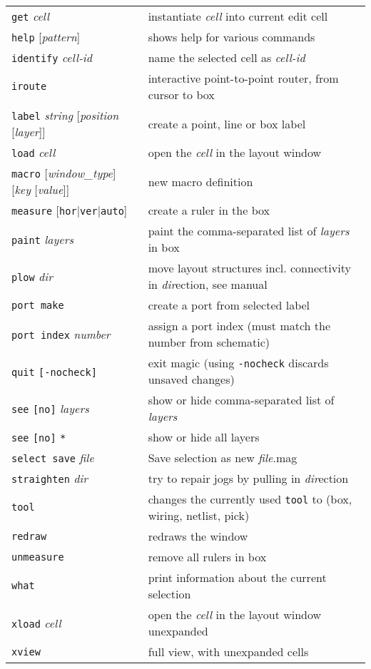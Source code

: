 \documentclass[10pt,a4paper]{article}
\newcommand{\mac}[1]{\texttt{#1}}
\newcommand{\argu}[1]{\textit{#1}}
\newcommand{\mouse}[1]{\texttt{#1}}
\begin{document}
\begin{tabular}{p{}p{}}
		\mac{get} \argu{cell} & instantiate \argu{cell} into current edit cell\\
		\mac{help} [\argu{pattern}] & shows help for various commands\\
		\mac{identify} \argu{cell-id} & name the selected cell as \argu{cell-id}\\
		\mac{iroute} & interactive point-to-point router, from cursor to box\\
		\mac{label} \argu{string} [\argu{position} [\argu{layer}]] & create a point, line or box label\\
		\mac{load} \argu{cell} & open the \argu{cell} in the layout window\\
		\mac{macro} [\argu{window\_type}] [\argu{key} [\argu{value}]] & new macro definition \\
		\mac{measure} [\mac{hor}|\mac{ver}|\mac{auto}] & create a ruler in the box\\
		\mac{paint} \argu{layers} & paint the comma-separated list of \argu{layers} in box\\
		\mac{plow} \argu{dir} & move layout structures incl. connectivity in \argu{dir}ection, see manual\\
		\mac{port make} & create a port from selected label\\
		\mac{port index} \argu{number} & assign a port index (must match the number from schematic)\\ 
		\mac{quit} \mac{[-nocheck]} & exit magic (using \mac{-nocheck} discards unsaved changes)\\
		\mac{see} \mac{[no]} \argu{layers} & show or hide comma-separated list of \argu{layers}\\
		\mac{see} \mac{[no]} \mac{*} & show or hide all layers\\
		\mac{select save} \argu{file} & Save selection as new \argu{file}.mag\\
		\mac{straighten} \argu{dir} & try to repair jogs by pulling in \argu{dir}ection\\
		\mac{tool} & changes the currently used \mouse{tool} to (box, wiring, netlist, pick)\\
		\mac{redraw} & redraws the window\\
		\mac{unmeasure} & remove all rulers in box\\
		\mac{what} & print information about the current selection\\
		\mac{xload} \argu{cell} & open the \argu{cell} in the layout window unexpanded\\
		\mac{xview} & full view, with unexpanded cells\\
		\bottomrule
	\end{tabular}
	
\end{document}
